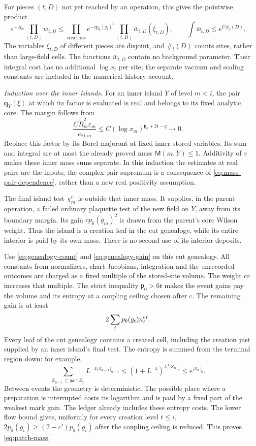 \documentclass[11pt,letterpaper,reqno]{amsart}
\theoremstyle{definition}
\theoremstyle{remark}
\begin{document}
For pieces \((t,D)\) not yet reached by an operation, this gives
the pointwise product
\begin{equation}\label{eq:mrg-product-majorant}
 e^{-A_{\mathrm{cr}}}\prod_{(t,D)}w_{t,D}
 \le\prod_{\mathrm{creations}}e^{-cp_0(g_t)^2}
                     \prod_{(t,D)}\bar w_{t,D}(\xi_{t,D}),
 \qquad
 \int\bar w_{t,D}\le e^{C\#_t(D)}.
\end{equation}
The variables \(\xi_{t,D}\) of different pieces are disjoint,
and \(\#_t(D)\) counts sites, rather than large-field cells.
The functions \(\bar w_{t,D}\) contain no background parameter.
Their integral cost has no additional \(\log x_t\) per site;
the separate vacuum and scaling constants are included in the
numerical history account.

\emph{Induction over the inner islands.}
For an inner island \(Y\) of level \(m<i\), the pair
\(\mathbf q_Y(\xi)\) at which its factor is evaluated is real and
belongs to its fixed analytic core. The margin follows from
\[
 \frac{C\check R_m^2\varepsilon_m}{\alpha_{0,m}}
       \le C(\log x_m)^{\mathfrak p_0+2\mathfrak r-q}
                          \longrightarrow0.
\]
Replace this factor by its Borel majorant at fixed inner stored
variables. Its sum and integral are at most the already proved
mass \(\mathsf M(m,Y)\le1\). Additivity of \(v\) makes these
inner mass sums separate. In this induction the estimates at real
pairs are the inputs; the complex-pair supremum is a consequence
of \eqref{eq:mass-pair-dependence}, rather than a new real
positivity assumption.

The final island test \(\chi_m^c\) is outside that inner mass.
It supplies, in the parent operation, a failed ordinary plaquette
test of the new field on \(Y\), away from its boundary margin.
Its gain \(cp_0(g_m)^2\) is drawn from the parent's core Wilson
weight. Thus the island is a creation leaf in the cut genealogy,
while its entire interior is paid by its own mass. There is no
second use of its interior deposits.

Use \eqref{eq:genealogy-count} and \eqref{eq:genealogy-gain} on
this cut genealogy. All constants from normalizers, chart
Jacobians, integration and the unrecorded outcomes are charged as
a fixed multiple of the stored-site volume. The weight \(cv\)
increases that multiple. The strict inequality
\(\mathfrak p_0>6\mathfrak r\) makes the event gains pay the
volume and its entropy at a coupling ceiling chosen after \(c\).
The remaining gain is at least
\[
 2\sum_t p_0(g_t)n_t^{\rm cr}.
\]
Every leaf of the cut genealogy contains a created cell, including
the creation just supplied by an inner island's final test.
The entropy is summed from the terminal region down: for example,
\[
 \sum_{Z_{n-1}\subset\mathsf{pa}^{-1}Z_n}
          L^{-4|Z_{n-1}|_{n-1}}
 \le(1+L^{-4})^{L^4|Z_n|_n}\le e^{|Z_n|_n}.
\]
Between events the geometry is deterministic. The possible place
where a preparation is interrupted costs its logarithm and is
paid by a fixed part of the weakest mark gain. The ledger already
includes these entropy costs. The lower flow bound gives,
uniformly for every creation level \(t\le i\),
\(2p_0(g_t)\ge(2-c')p_0(g_i)\) after the coupling ceiling is
reduced. This proves \eqref{eq:patch-mass}.
\end{document}
